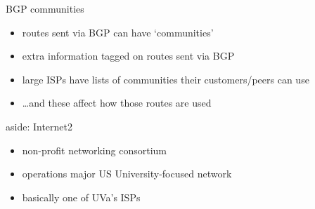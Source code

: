 \begin{frame}{BGP communities}
    \begin{itemize}
    \item routes sent via BGP can have `communities'
    \item extra information tagged on routes sent via BGP
    \vspace{.5cm}
    \item large ISPs have lists of communities their customers/peers can use
    \item \ldots and these affect how those routes are used
    \end{itemize}
\end{frame}

\begin{frame}{aside: Internet2}
    \begin{itemize}
    \item non-profit networking consortium
    \item operations major US University-focused network
    \item basically one of UVa's ISPs
    \end{itemize}
\end{frame}

